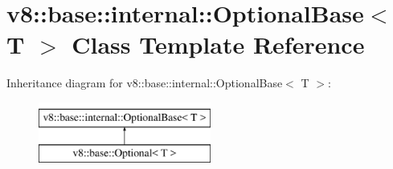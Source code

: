 \hypertarget{classv8_1_1base_1_1internal_1_1OptionalBase}{}\section{v8\+:\+:base\+:\+:internal\+:\+:Optional\+Base$<$ T $>$ Class Template Reference}
\label{classv8_1_1base_1_1internal_1_1OptionalBase}
Inheritance diagram for v8\+:\+:base\+:\+:internal\+:\+:Optional\+Base$<$ T $>$\+:\begin{figure}[H]
\begin{center}
\leavevmode
\includegraphics[height=2.000000cm]{classv8_1_1base_1_1internal_1_1OptionalBase}
\end{center}
\end{figure}
